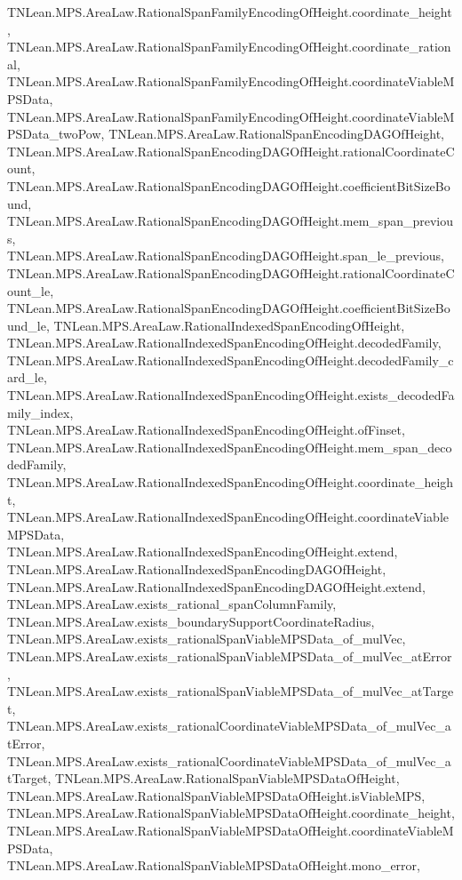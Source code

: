 \begin{lemma}
{        TNLean.MPS.AreaLaw.RationalSpanFamilyEncodingOfHeight.coordinate_height,
        TNLean.MPS.AreaLaw.RationalSpanFamilyEncodingOfHeight.coordinate_rational,
        TNLean.MPS.AreaLaw.RationalSpanFamilyEncodingOfHeight.coordinateViableMPSData,
        TNLean.MPS.AreaLaw.RationalSpanFamilyEncodingOfHeight.coordinateViableMPSData_twoPow,
        TNLean.MPS.AreaLaw.RationalSpanEncodingDAGOfHeight,
        TNLean.MPS.AreaLaw.RationalSpanEncodingDAGOfHeight.rationalCoordinateCount,
        TNLean.MPS.AreaLaw.RationalSpanEncodingDAGOfHeight.coefficientBitSizeBound,
        TNLean.MPS.AreaLaw.RationalSpanEncodingDAGOfHeight.mem_span_previous,
        TNLean.MPS.AreaLaw.RationalSpanEncodingDAGOfHeight.span_le_previous,
        TNLean.MPS.AreaLaw.RationalSpanEncodingDAGOfHeight.rationalCoordinateCount_le,
        TNLean.MPS.AreaLaw.RationalSpanEncodingDAGOfHeight.coefficientBitSizeBound_le,
        TNLean.MPS.AreaLaw.RationalIndexedSpanEncodingOfHeight,
        TNLean.MPS.AreaLaw.RationalIndexedSpanEncodingOfHeight.decodedFamily,
        TNLean.MPS.AreaLaw.RationalIndexedSpanEncodingOfHeight.decodedFamily_card_le,
        TNLean.MPS.AreaLaw.RationalIndexedSpanEncodingOfHeight.exists_decodedFamily_index,
        TNLean.MPS.AreaLaw.RationalIndexedSpanEncodingOfHeight.ofFinset,
        TNLean.MPS.AreaLaw.RationalIndexedSpanEncodingOfHeight.mem_span_decodedFamily,
        TNLean.MPS.AreaLaw.RationalIndexedSpanEncodingOfHeight.coordinate_height,
        TNLean.MPS.AreaLaw.RationalIndexedSpanEncodingOfHeight.coordinateViableMPSData,
        TNLean.MPS.AreaLaw.RationalIndexedSpanEncodingOfHeight.extend,
        TNLean.MPS.AreaLaw.RationalIndexedSpanEncodingDAGOfHeight,
        TNLean.MPS.AreaLaw.RationalIndexedSpanEncodingDAGOfHeight.extend,
        TNLean.MPS.AreaLaw.exists_rational_spanColumnFamily,
        TNLean.MPS.AreaLaw.exists_boundarySupportCoordinateRadius,
        TNLean.MPS.AreaLaw.exists_rationalSpanViableMPSData_of_mulVec,
        TNLean.MPS.AreaLaw.exists_rationalSpanViableMPSData_of_mulVec_atError,
        TNLean.MPS.AreaLaw.exists_rationalSpanViableMPSData_of_mulVec_atTarget,
        TNLean.MPS.AreaLaw.exists_rationalCoordinateViableMPSData_of_mulVec_atError,
        TNLean.MPS.AreaLaw.exists_rationalCoordinateViableMPSData_of_mulVec_atTarget,
        TNLean.MPS.AreaLaw.RationalSpanViableMPSDataOfHeight,
        TNLean.MPS.AreaLaw.RationalSpanViableMPSDataOfHeight.isViableMPS,
        TNLean.MPS.AreaLaw.RationalSpanViableMPSDataOfHeight.coordinate_height,
        TNLean.MPS.AreaLaw.RationalSpanViableMPSDataOfHeight.coordinateViableMPSData,
        TNLean.MPS.AreaLaw.RationalSpanViableMPSDataOfHeight.mono_error,
}
\end{lemma}
